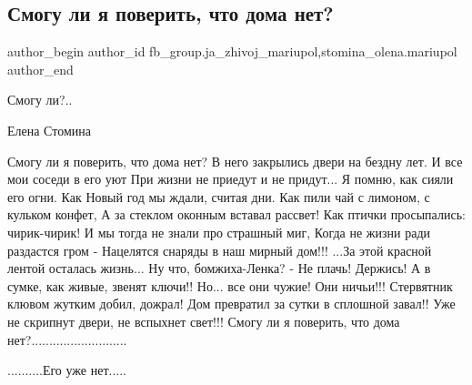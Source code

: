  
 
 
 
 

\subsection{Смогу ли я поверить, что дома нет?}
\label{sec:25_02_2023.fb.fb_group.ja_zhivoj_mariupol.1.smogu_li_ya_poverit_}
 
\ifcmt
 author_begin
   author_id fb_group.ja_zhivoj_mariupol,stomina_olena.mariupol
 author_end
\fi

Смогу ли?..

Елена Стомина

\obeycr
Смогу ли я поверить, что дома нет?
В него закрылись двери на бездну лет.
И все мои соседи в его уют
При жизни не приедут и не придут...
Я помню, как сияли его огни.
Как  Новый год мы ждали, считая дни.
Как пили чай с лимоном, с кульком конфет,
А за стеклом оконным вставал рассвет!
Как птички просыпались: чирик-чирик!
И мы тогда не знали про страшный миг,
Когда не жизни ради раздастся гром -
Нацелятся снаряды в наш мирный дом!!!
...За этой красной лентой осталась жизнь...
Ну что, бомжиха-Ленка? - Не плачь! Держись!
А в сумке, как живые, звенят ключи!!
Но... все они  чужие! Они ничьи!!!
Стервятник клювом жутким добил, дожрал!
Дом превратил за сутки в сплошной завал!!
Уже не скрипнут двери, не вспыхнет свет!!!
Смогу ли я поверить, что дома нет?...........................
\restorecr

..........Его уже нет.....
